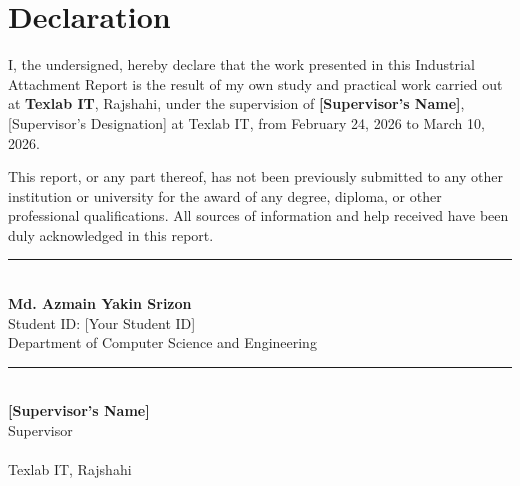 \chapter*{Declaration}

I, the undersigned, hereby declare that the work presented in this Industrial Attachment Report is the result of my own study and practical work carried out at \textbf{Texlab IT}, Rajshahi, under the supervision of \textbf{[Supervisor's Name]}, [Supervisor's Designation] at Texlab IT, from February 24, 2026 to March 10, 2026.

This report, or any part thereof, has not been previously submitted to any other institution or university for the award of any degree, diploma, or other professional qualifications. All sources of information and help received have been duly acknowledged in this report.

\vspace{3cm}

\noindent
\begin{minipage}[t]{0.45\textwidth}
    \rule{\textwidth}{0.4pt} \\
    \textbf{Md. Azmain Yakin Srizon} \\
    Student ID: [Your Student ID] \\
    Department of Computer Science and Engineering \\
    [Your University Name]
\end{minipage}
\hfill
\begin{minipage}[t]{0.45\textwidth}
    \rule{\textwidth}{0.4pt} \\
    \textbf{[Supervisor's Name]} \\
    Supervisor \\
    [Supervisor's Designation] \\
    Texlab IT, Rajshahi
\end{minipage}
